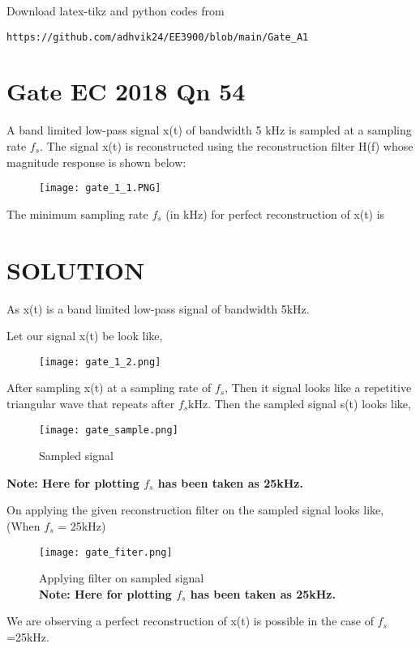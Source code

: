 \documentclass[journal,12pt,twocolumn]{IEEEtran}
\begin{document}
%
Download latex-tikz and python codes from 
%
\begin{lstlisting}
https://github.com/adhvik24/EE3900/blob/main/Gate_A1
\end{lstlisting}

\section{Gate EC 2018 Qn 54}
A band limited low-pass signal x(t) of bandwidth 5 kHz is sampled at a sampling rate $f_s$.
The signal x(t) is reconstructed using the reconstruction filter H(f) whose magnitude response is shown below:

\begin{figure}[htp]
    \centering
    \texttt{[image: gate\_1\_1.PNG]}
\end{figure}

The minimum sampling rate $f_s$ (in kHz) for perfect reconstruction of x(t) is
\section{SOLUTION}
As x(t) is a band limited low-pass signal of bandwidth 5kHz.

Let our signal x(t) be look like,
\begin{figure}[htp]
    \centering
    \texttt{[image: gate\_1\_2.png]}
\end{figure}

After sampling x(t) at a sampling rate of $f_s$, Then it signal looks like a repetitive triangular wave that repeats after $f_s$kHz.
Then the sampled signal s(t) looks like,
\begin{figure}[htp]
    \centering
    \texttt{[image: gate\_sample.png]}
    \caption{Sampled signal}
\end{figure}

\textbf{Note: Here for plotting $f_s$ has been taken as 25kHz.}

On applying the given reconstruction filter on the sampled signal looks like,
(When $f_s$ = 25kHz)
\begin{figure}[htp]
    \centering
    \texttt{[image: gate\_fiter.png]}
    \caption{Applying filter on sampled signal
    \\\textbf{Note: Here for plotting $f_s$ has been taken as 25kHz.}}
\end{figure}

We are observing a perfect reconstruction of x(t) is possible in the case of $f_s$=25kHz.
\end{document}
